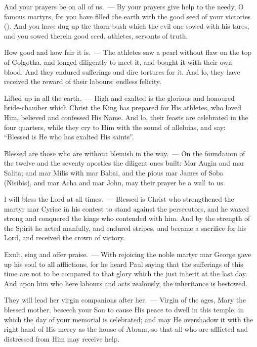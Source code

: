 \documentclass[12pt,twoside,a5paper]{article}
\begin{document}
\begin{halfparskip}
  And your prayers be on all of us.~--- By your prayers give help to the needy, O famous martyrs, for you have filled the earth with the good seed of your victories (). And you have dug up the thorn-bush which the evil one sowed with his tares, and you sowed therein good seed, athletes, servants of truth.

  How good and how fair it is.~--- The athletes saw a pearl without flaw on the top of Golgotha, and longed diligently to meet it, and bought it with their own blood. And they endured sufferings and dire tortures for it. And lo, they have received the reward of their labours: endless felicity.

  Lifted up in all the earth.~--- High and exalted is the glorious and honoured bride-chamber which Christ the King has prepared for His athletes, who loved Him, believed and confessed His Name. And lo, their feasts are celebrated in the four quarters, while they cry to Him with the sound of alleluias, and say: ``Blessed is He who has exalted His saints''.

  Blessed are those who are without blemish in the way.~--- On the foundation of the twelve and the seventy apostles the diligent ones built: Mar Augin and mar Salita; and mar Milis with mar Babai, and the pious mar James of Soba (Nisibis), and mar Acha and mar John, may their prayer be a wall to us.

  I will bless the Lord at all times.~--- Blessed is Christ who strengthened the martyr mar Cyriac in his contest to stand against the persecutors, and he waxed strong and conquered the kings who contended with him. And by the strength of the Spirit he acted manfully, and endured stripes, and became a sacrifice for his Lord, and received the crown of victory.

  Exult, sing and offer praise.~--- With rejoicing the noble martyr mar George gave up his soul to all afflictions, for he heard Paul saying that the sufferings of this time are not to be compared to that glory which the just inherit at the last day. And upon him who here labours and acts zealously, the inheritance is bestowed.

  They will lead her virgin companions after her.~--- Virgin of the ages, Mary the blessed mother, beseech your Son to cause His peace to dwell in this temple, in which the day of your memorial is celebrated; and may He overshadow it with the right hand of His mercy as the house of Abram, so that all who are afflicted and distressed from Him may receive help.


\end{halfparskip}
\end{document}
